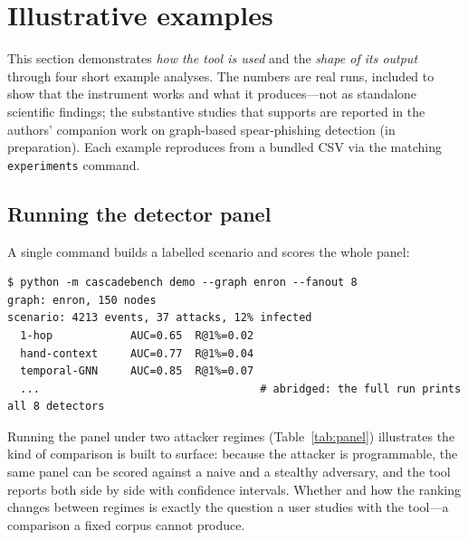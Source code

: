 \section{Illustrative examples}
\label{sec:results}

This section demonstrates \emph{how the tool is used} and the \emph{shape of its output}
through four short example analyses. The numbers are real \tool runs, included to show that
the instrument works and what it produces---not as standalone scientific findings; the
substantive studies that \tool supports are reported in the authors' companion work on
graph-based spear-phishing detection (in preparation). Each example reproduces from a bundled
CSV via the matching \texttt{experiments} command.

\subsection{Running the detector panel}
A single command builds a labelled scenario and scores the whole panel:

\begin{lstlisting}
$ python -m cascadebench demo --graph enron --fanout 8
graph: enron, 150 nodes
scenario: 4213 events, 37 attacks, 12% infected
  1-hop            AUC=0.65  R@1%=0.02
  hand-context     AUC=0.77  R@1%=0.04
  temporal-GNN     AUC=0.85  R@1%=0.07
  ...                                  # abridged: the full run prints all 8 detectors
\end{lstlisting}

Running the panel under two attacker regimes (Table~\ref{tab:panel}) illustrates the kind of
comparison \tool is built to surface: because the attacker is programmable, the same panel can
be scored against a naive and a stealthy adversary, and the tool reports both side by side with
confidence intervals. Whether and how the ranking changes between regimes is exactly the
question a user studies with the tool---a comparison a fixed corpus cannot produce.

